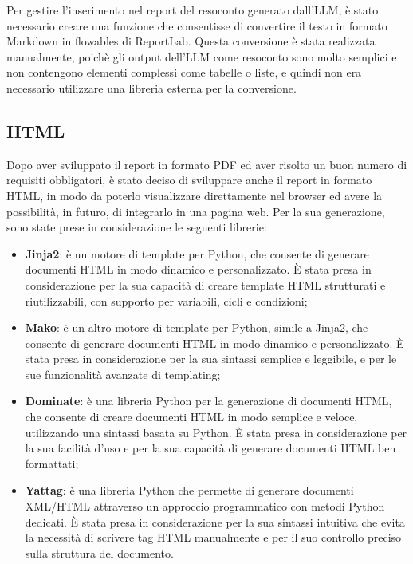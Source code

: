 Per gestire l'inserimento nel report del resoconto generato dall'LLM, è stato necessario creare una funzione che consentisse di convertire il testo in formato Markdown in flowables di ReportLab. Questa conversione è stata realizzata manualmente, poichè gli output dell'LLM come resoconto sono molto semplici e non contengono elementi complessi come tabelle o liste, e quindi non era necessario utilizzare una libreria esterna per la conversione.


\subsection{HTML}

Dopo aver sviluppato il report in formato PDF ed aver risolto un buon numero di requisiti obbligatori, è stato deciso di sviluppare anche il report in formato HTML, in modo da poterlo visualizzare direttamente nel browser ed avere la possibilità, in futuro, di integrarlo in una pagina web. Per la sua generazione, sono state prese in considerazione le seguenti librerie:
\begin{itemize}
    \item \textbf{Jinja2}: è un motore di template per Python, che consente di generare documenti HTML in modo dinamico e personalizzato. È stata presa in considerazione per la sua capacità di creare template HTML strutturati e riutilizzabili, con supporto per variabili, cicli e condizioni;
    \item \textbf{Mako}: è un altro motore di template per Python, simile a Jinja2, che consente di generare documenti HTML in modo dinamico e personalizzato. È stata presa in considerazione per la sua sintassi semplice e leggibile, e per le sue funzionalità avanzate di templating;
    \item \textbf{Dominate}: è una libreria Python per la generazione di documenti HTML, che consente di creare documenti HTML in modo semplice e veloce, utilizzando una sintassi basata su Python. È stata presa in considerazione per la sua facilità d'uso e per la sua capacità di generare documenti HTML ben formattati;
    \item \textbf{Yattag}: è una libreria Python che permette di generare documenti XML/HTML attraverso un approccio programmatico con metodi Python dedicati. È stata presa in considerazione per la sua sintassi intuitiva che evita la necessità di scrivere tag HTML manualmente e per il suo controllo preciso sulla struttura del documento.
\end{itemize}

